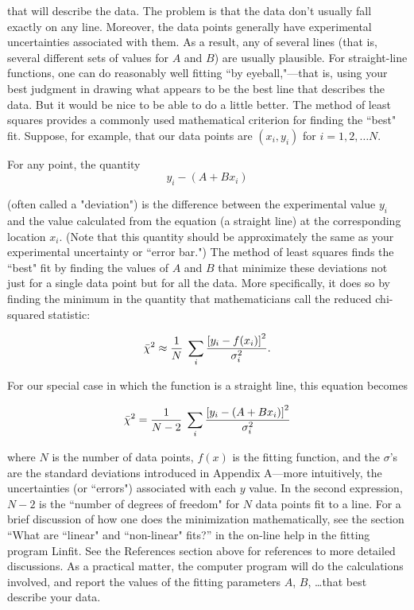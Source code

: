  that will describe the data.  The problem is that the
data don't usually fall exactly on any line.  Moreover,
the data points generally have experimental uncertainties
associated with them.  As a result, any of
several lines (that is, several different sets of values for $A$ and
$B$) are usually plausible.  For straight-line functions, one can do
reasonably well fitting ``by
eyeball,"---that is, using your best judgment in drawing what appears to
be the best line that describes the data.  But it would be nice
to be able to do a little better.  The method of least squares
provides
a commonly used mathematical criterion for finding the ``best" fit.
Suppose, for example, that our data points are 
$(x_i, y_i)$ for $i=1,2,\ldots N$.

For any point, the quantity
\[
y_i -(A + Bx_i)
\]

(often called a "deviation") is the difference between the
experimental value $y_i$ and the value calculated from the equation 
(a
straight line) at the corresponding location $x_i$.  (Note that
this quantity should be approximately the same as your experimental
uncertainty or ``error bar.") The method of least squares finds the
``best" fit by finding the values of $A$ and $B$ that minimize these
deviations not just for a single data point but for all the
data.  More specifically, it does so by finding the minimum in the
quantity that mathematicians call the reduced chi-squared statistic:


\begin{equation}
\bar{\chi}^{2} \approx {{1} \over {N}} \; \sum_{i} {{\left[y_{i} -
         f(x_{i})\right]^{2}} \over {\sigma_{i}^{2}}} .
         \label{eq:chisq}
\end{equation}

For our special case in which the function is a straight line, this
equation becomes

\[
\bar{\chi}^{2}= {{1} \over {N-2}} \; \sum_{i} {{\left[y_{i} -
         (A + Bx_{i})\right]^{2}} \over {\sigma_{i}^{2}}}
\]

where $N$ is the number of data points, $f(x)$ is the fitting
function,
and the $\sigma$'s are the standard deviations introduced in Appendix
A---more intuitively, the uncertainties (or ``errors") associated
with
each $y$ value.  In the second expression, $N-2$ is the 
``number of degrees of freedom" for $N$ data points fit to a line.
For a brief discussion of how one does the minimization
mathematically,
see the section ``What are ``linear" and ``non-linear" fits?'' in the
on-line help in the fitting program Linfit.  See
the References section above for references to more detailed
discussions.  As a practical matter, the computer program will do the
calculations involved, and report the values of the fitting parameters
$A$, $B$, \ldots that best describe your data.

